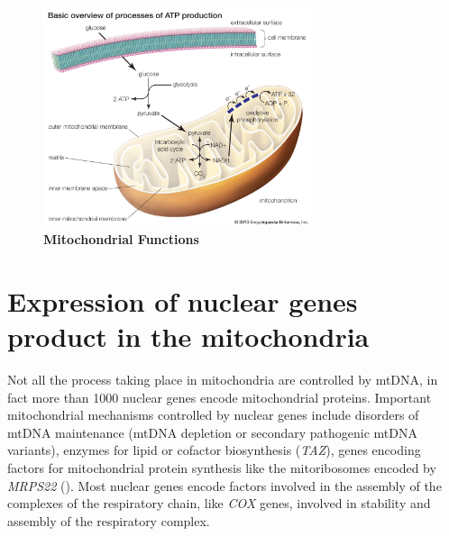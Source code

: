 \begin{figure}[H]
\centering
\includegraphics[width=0.7\textwidth]{Fig/processes-production-ATP-glycolysis-tricarboxylic-acid-cycle.jpg}
\decoRule
\caption{\textbf{Mitochondrial Functions}}
\label{fig:Mitochondrial Function}
\end{figure}


\section{Expression of nuclear genes product in the mitochondria}
Not all the process taking place in mitochondria are controlled by mtDNA, in fact more than 1000 nuclear genes encode mitochondrial proteins.
Important mitochondrial mechanisms controlled by nuclear genes include disorders of mtDNA maintenance (mtDNA depletion or secondary pathogenic mtDNA variants), enzymes for lipid or cofactor biosynthesis (\textit{TAZ}), genes encoding factors for mitochondrial protein synthesis like the mitoribosomes encoded by \textit{MRPS22} (\cite{caggese1999identification, chinnery2014mitochondrial}). 
Most nuclear genes encode factors involved in the assembly of the complexes of the respiratory chain, like \textit{COX} genes, involved in stability and assembly of the respiratory complex.



